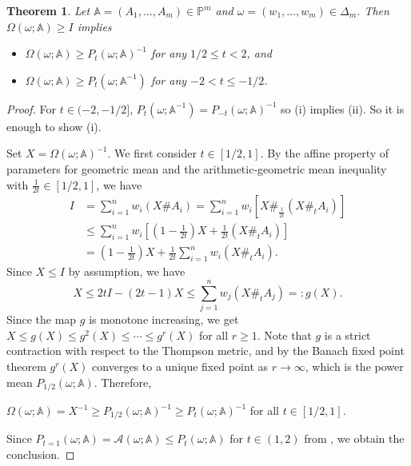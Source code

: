 \documentclass[12pt,reqno]{amsart}
\newtheorem{theorem}{Theorem}[section]
\begin{document}
\begin{theorem}
Let $\mathbb{A} = (A_1, \ldots, A_m) \in \mathbb{P}^m$ and $\omega = (w_{1}, \dots, w_{m}) \in \Delta_{m}$. Then $\Omega(\omega; \mathbb{A}) \geq I$ implies
\begin{itemize}
  \item[(i)] $\Omega(\omega; \mathbb{A}) \geq P_{t}(\omega; \mathbb{A})^{-1}$ for any $1/2 \leq t <2$, and
  \item[(ii)] $\Omega(\omega; \mathbb{A}) \geq P_{t}(\omega; \mathbb{A}^{-1})$ for any $-2 < t \leq -1/2$.
\end{itemize}
\end{theorem}

\begin{proof}
For $t \in (-2, -1/2]$, $P_{t}(\omega; \mathbb{A}^{-1}) = P_{-t}(\omega; \mathbb{A})^{-1}$ so (i) implies (ii). So it is enough to show (i).

Set $X = \Omega(\omega; \mathbb{A})^{-1}$. We first consider $t \in [1/2,1]$.
By the affine property of parameters for geometric mean and the arithmetic-geometric mean inequality with $\frac{1}{2t} \in [1/2, 1]$, we have
\begin{displaymath}
\begin{split}
I & = \sum_{i=1}^{n} w_{i} (X \# A_{i}) = \sum_{i=1}^{n} w_{i} \left[ X \#_{\frac{1}{2t}} (X \#_{t} A_{i}) \right] \\
& \leq \sum_{i=1}^{n} w_{i} \left[ \left( 1 - \frac{1}{2t} \right) X + \frac{1}{2t} (X \#_{t} A_{i}) \right] \\
& = \left( 1 - \frac{1}{2t} \right) X + \frac{1}{2t} \sum_{i=1}^{n} w_{i} (X \#_{t} A_{i}).
\end{split}
\end{displaymath}
Since $X \leq I$ by assumption, we have
\begin{displaymath}
X \leq 2t I - ( 2t - 1 ) X \leq \sum_{j=1}^{n} w_{j} (X \#_{t} A_{j}) =: g(X).
\end{displaymath}
Since the map $g$ is monotone increasing, we get $X \leq g(X) \leq g^{2}(X) \leq \cdots \leq g^{r}(X)$ for all $r \geq 1$. Note that $g$ is a strict contraction with respect to the Thompson metric, and by the Banach fixed point theorem $g^{r}(X)$ converges to a unique fixed point as $r \to \infty$, which is the power mean $P_{1/2}(\omega; \mathbb{A})$.
Therefore,
\begin{center}
$\Omega(\omega; \mathbb{A}) = X^{-1} \geq P_{1/2}(\omega; \mathbb{A})^{-1} \geq P_{t}(\omega; \mathbb{A})^{-1}$ \quad for all $t \in [1/2,1]$.
\end{center}
Since $P_{t=1}(\omega; \mathbb{A}) = \mathcal{A}(\omega; \mathbb{A}) \leq P_{t}(\omega; \mathbb{A})$ for $t \in (1,2)$
from \cite[Proposition 4.5 (v)]{Seo}, we obtain the conclusion.
\end{proof}
\end{document}
